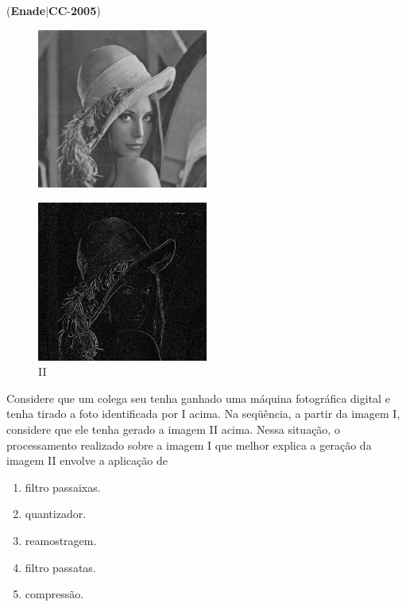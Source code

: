 \documentclass{exam}
\begin{document}
\begin{questions}
\question (\textbf{Enade}$|$\textbf{CC}-\textbf{2005}) \begin{figure}[H]
	\begin{center}
		\includegraphics[width=0.5\textwidth]{CIENCIA_DA_COMPUTACAO_Prova2005-utf8_figuras/fig-0027.jpg}
	\end{center}
\end{figure}
\begin{figure}[H]
	\begin{center}
		\includegraphics[width=0.5\textwidth]{CIENCIA_DA_COMPUTACAO_Prova2005-utf8_figuras/fig-0028.jpg}
		\caption{II}
	\end{center}
\end{figure}
Considere que um colega seu tenha ganhado uma máquina
fotográfica digital e tenha tirado a foto identificada por I acima.
Na seqüência, a partir da imagem I, considere que ele tenha
gerado a imagem II acima. Nessa situação, o processamento
realizado sobre a imagem I que melhor explica a geração da
imagem II envolve a aplicação de
	\begin{enumerate}[label=\alph*)]
		\item  filtro passaixas.
		\item  quantizador.
		\item  reamostragem.
		\item  filtro passatas.
		\item  compressão.


\end{enumerate}
\end{questions}
\end{document}
